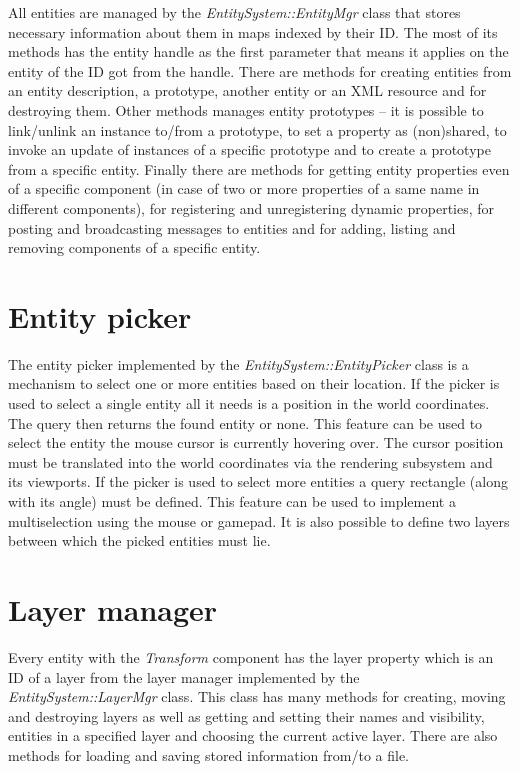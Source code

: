 \documentclass[a4paper, 12pt]{report}
\begin{document}
All entities are managed by the \emph{EntitySystem::EntityMgr} class that stores necessary information about them in maps indexed by their ID. The most of its methods has the entity handle as the first parameter that means it applies on the entity of the ID got from the handle. There are methods for creating entities from an entity description, a prototype, another entity or an XML resource and for destroying them. Other methods manages entity prototypes -- it is possible to link/unlink an instance to/from a prototype, to set a property as (non)shared, to invoke an update of instances of a specific prototype and to create a prototype from a specific entity. Finally there are methods for getting entity properties even of a specific component (in case of two or more properties of a same name in different components), for registering and unregistering dynamic properties, for posting and broadcasting messages to entities and for adding, listing and removing components of a specific entity.

\section{Entity picker}

The entity picker implemented by the \emph{EntitySystem::EntityPicker} class is a mechanism to select one or more entities based on their location. If the picker is used to select a single entity all it needs is a position in the world coordinates. The query then returns the found entity or none. This feature can be used to select the entity the mouse cursor is currently hovering over. The cursor position must be translated into the world coordinates via the rendering subsystem and its viewports. If the picker is used to select more entities a query rectangle (along with its angle) must be defined. This feature can be used to implement a multiselection using the mouse or gamepad. It is also possible to define two layers between which the picked entities must lie.

\section{Layer manager}

Every entity with the \emph{Transform} component has the layer property which is an ID of a layer from the layer manager implemented by the \emph{EntitySystem::LayerMgr} class. This class has many methods for creating, moving and destroying layers as well as getting and setting their names and visibility, entities in a specified layer and choosing the current active layer. There are also methods for loading and saving stored information from/to a file.
\end{document}
